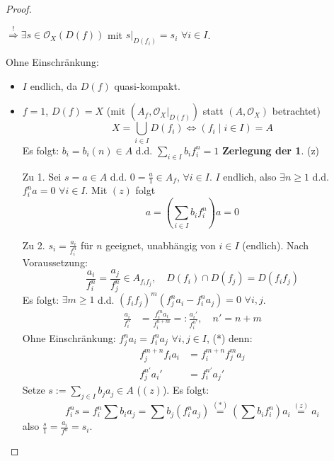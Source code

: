 \begin{proof}
\begin{enumerate}
    $\overset{!}{\Rightarrow}\exists s\in\mathcal{O}_{X}(D(f))$ mit $s|_{D(f_{i})}=s_{i}$
    $\forall i\in I$.
  \end{enumerate}
  Ohne Einschränkung:
  \begin{itemize}
  \item $I$ endlich, da $D(f)$ quasi-kompakt.
  \item $f=1$, $D(f)=X$ (mit $(A_{f},\mathcal{O}_{X}|_{D(f)})$ statt $(A,\mathcal{O}_{X})$
    betrachtet) 
    \[
    X=\bigcup_{i\in I}D(f_{i})\Leftrightarrow(f_{i}\mid i\in I)=A
    \]
    Es folgt: $b_{i}=b_{i}(n)\in A$ d.d. $\sum_{i\in I}b_{i}f_{i}^{n}=1$
    \textbf{Zerlegung der 1}. (z)
  \item[Zu 1.] Sei $s=a\in A$ d.d. $0=\frac{a}{1}\in A_{f}$, $\forall i\in I$.
    $I$ endlich, also $\exists n\geq1$ d.d. $f_{i}^{n}a=0$ $\forall i\in I$.
    Mit $(z)$ folgt
    \[
    a=\left(\sum_{i\in I}b_{i}f_{i}^{n}\right)a=0
    \]
  \item[Zu 2.] $s_{i}=\frac{a_{i}}{f_{i}^{n}}$ für $n$ geeignet, unabhängig von
    $i\in I$ (endlich). Nach Voraussetzung:
    \[
    \frac{a_{i}}{f_{i}^{n}}=\frac{a_{j}}{f_{j}^{n}}\in A_{f_{i}f_{j}},\quad D(f_{i})\cap D(f_{j})=D(f_{i}f_{j})
    \]
    Es folgt: $\exists m\geq1$ d.d. $(f_{i}f_{j})^{m}(f_{j}^{n}a_{i}-f_{i}^{n}a_{j})=0$
    $\forall i,j$.
    \begin{align*}
      \frac{a_{i}}{f_{i}^{n}} & =\frac{f_{i}^{m}a_{i}}{f_{i}^{n+m}}=:\frac{a_{i}'}{f_{i}^{n'}},\quad n'=n+m
    \end{align*}
    Ohne Einschränkung: $f_{j}^{n}a_{i}=f_{i}^{n}a_{j}$ $\forall i,j\in I$,
    ({*}) denn:
    \begin{align*}
      f_{j}^{m+n}f_{i}a_{i} & =f_{i}^{m+n}f_{j}^{m}a_{j}\\
      f_{j}^{n'}a_{i}' & =f_{i}^{n'}a_{j}'
    \end{align*}
    Setze $s:=\sum_{j\in I}b_{j}a_{j}\in A$ ($(z)$). Es folgt:
    \[
    f_{i}^{n}s=f_{i}^{n}\sum b_{i}a_{j}=\sum b_{j}(f_{i}^{n}a_{j})\overset{(*)}{=}\left(\sum b_{i}f_{i}^{n}\right)a_{i}\overset{(z)}{=}a_{i}
    \]
    also $\frac{s}{1}=\frac{a_{i}}{f^{n}}=s_{i}$.
  \end{itemize}
\end{proof}



